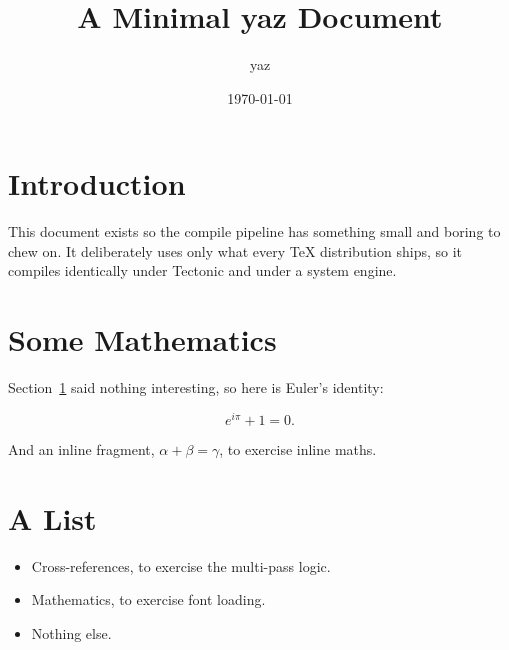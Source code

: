 \documentclass[11pt]{article}
\title{A Minimal yaz Document}
\author{yaz}
\date{\today}
\begin{document}
\maketitle

\section{Introduction}
\label{sec:intro}

This document exists so the compile pipeline has something small and boring to
chew on. It deliberately uses only what every TeX distribution ships, so it
compiles identically under Tectonic and under a system engine.

\section{Some Mathematics}

Section~\ref{sec:intro} said nothing interesting, so here is Euler's identity:

\begin{equation}
  e^{i\pi} + 1 = 0.
\end{equation}

And an inline fragment, $\alpha + \beta = \gamma$, to exercise inline maths.

\section{A List}

\begin{itemize}
  \item Cross-references, to exercise the multi-pass logic.
  \item Mathematics, to exercise font loading.
  \item Nothing else.
\end{itemize}
\end{document}
